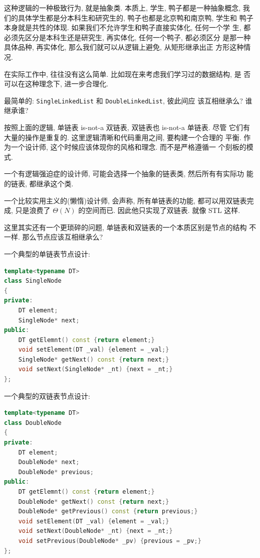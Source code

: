 \documentclass[a4paper]{ctexart}
\theoremstyle{definition}
\theoremstyle{definition}
\begin{document}
这种逻辑的一种极致行为, 就是抽象类. 本质上, 学生, 鸭子都是一种抽象概念,
我们的具体学生都是分本科生和研究生的, 鸭子也都是北京鸭和南京鸭, 学生和
鸭子本身就是共性的体现. 如果我们不允许学生和鸭子直接实体化, 任何一个学
生, 都必须先区分是本科生还是研究生, 再实体化, 任何一个鸭子, 都必须区分
是那一种具体品种, 再实体化, 那么我们就可以从逻辑上避免, 从矩形继承出正
方形这种情况. 

在实际工作中, 往往没有这么简单. 比如现在来考虑我们学习过的数据结构, 是
否可以在这种理念下, 进一步合理化.

最简单的: \verb|SingleLinkedList| 和 \verb|DoubleLinkedList|, 彼此间应
该互相继承么? 谁继承谁?

按照上面的逻辑, 单链表 is-not-a 双链表, 双链表也 is-not-a 单链表. 尽管
它们有大量的操作是重复的. 这里逻辑清晰和代码重用之间, 要构建一个合理的
平衡. 作为一个设计师, 这个时候应该体现你的风格和理念. 而不是严格遵循一
个刻板的模式. 

一个有逻辑强迫症的设计师, 可能会选择一个抽象的链表类, 然后所有有实际功
能的链表, 都继承这个类.

一个比较实用主义的(懒惰)设计师, 会声称, 所有单链表的功能, 都可以用双链表完成,
只是浪费了 $\Theta(N)$ 的空间而已. 因此他只实现了双链表. 就像 STL 这样.

这里其实还有一个更琐碎的问题, 单链表和双链表的一个本质区别是节点的结构
不一样. 那么节点应该互相继承么?

一个典型的单链表节点设计:

\begin{lstlisting}[language=C++]
template<typename DT>
class SingleNode
{
private:
    DT element;
    SingleNode* next;
public:
    DT getElemnt() const {return element;}
    void setElement(DT _val) {element = _val;}
    SingleNode* getNext() const {return next;}
    void setNext(SingleNode* _nt) {next = _nt;} 
};
\end{lstlisting}

一个典型的双链表节点设计:

\begin{lstlisting}[language=C++]
template<typename DT>
class DoubleNode
{
private:
    DT element;
    DoubleNode* next;
    DoubleNode* previous;
public:
    DT getElemnt() const {return element;}
    DoubleNode* getNext() const {return next;}
    DoubleNode* getPrevious() const {return previous;}
    void setElement(DT _val) {element = _val;}
    void setNext(DoubleNode* _nt) {next = _nt;}
    void setPrevious(DoubleNode* _pv) {previous = _pv;}
};
\end{lstlisting}
\end{document}
